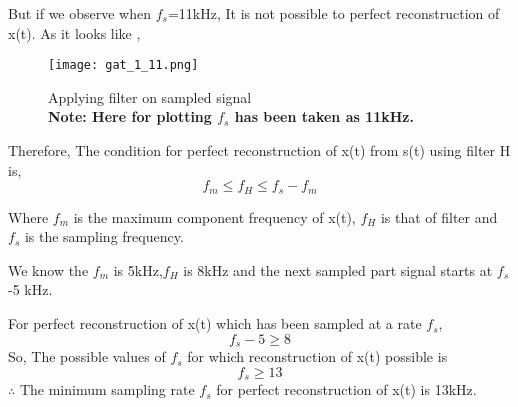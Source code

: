 \documentclass[journal,12pt,twocolumn]{IEEEtran}
\begin{document}
But if we observe when $f_s$=11kHz, It is not possible to perfect reconstruction of x(t). As it looks like ,
\begin{figure}[htp]
    \centering
    \texttt{[image: gat\_1\_11.png]}
    \caption{Applying filter on sampled signal
    \\\textbf{Note: Here for plotting $f_s$ has been taken as 11kHz.}}
\end{figure}
\newpage
Therefore, The condition for perfect reconstruction of x(t) from s(t) using filter H is,
$$f_m\le f_H\le f_s-f_m$$

Where $f_m$ is the maximum component frequency of x(t), $f_H$ is that of filter and $f_s$ is the sampling frequency.

We know the $f_m$ is 5kHz,$f_H$ is 8kHz and the next sampled part signal starts at $f_s$-5 kHz.

For perfect reconstruction of x(t) which has been sampled at a rate $f_s$, $$f_s-5 \ge 8$$
So, The possible values of $f_s$ for which reconstruction of x(t) possible is 
$$f_s \ge 13$$
$\therefore$ The minimum sampling rate $f_s$ for perfect reconstruction of x(t) is 13kHz.
\end{document}
